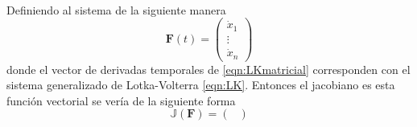 \documentclass[11pt,a4paper]{article}
\begin{document}
\\
Definiendo al sistema de la siguiente manera
\begin{equation}\label{eqn:LKmatricial}
	\mathbf{F}(t)=\begin{pmatrix}
		\dot{x}_1\\
		\vdots\\
		\dot{x}_n
	\end{pmatrix}
\end{equation}
donde el vector de derivadas temporales de \ref{eqn:LKmatricial} corresponden con el sistema generalizado de Lotka-Volterra \ref{eqn:LK}. Entonces el jacobiano es esta función vectorial se vería de la siguiente forma
\begin{equation}
	\mathbb{J}(\mathbf{F}) = \begin{pmatrix}
		
	\end{pmatrix}
\end{equation}
\end{document}
